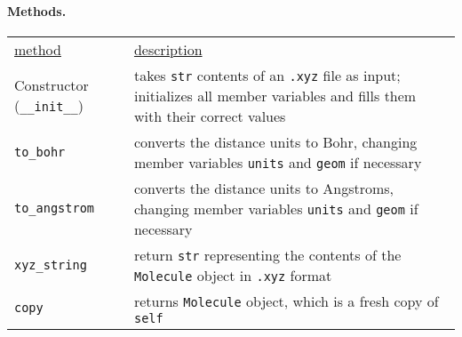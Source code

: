 \documentclass[fleqn]{article}
\newcommand{\linl}[1]{\lstinline{#1}{}}
\newcommand{\ul}[1]{\underline{#1}}
\begin{document}
\paragraph{Methods.}
\begin{center}
\begin{tabular}{p{}@{}p{}}
  \ul{method} & \ul{description}\\
  Constructor (\linl{__init__})
  & takes \linl{str} contents of an \linl{.xyz} file as input; initializes all member variables and fills them with their correct values\\
  \linl{to_bohr}
  & converts the distance units to Bohr, changing member variables \linl{units} and \linl{geom} if necessary \\
  \linl{to_angstrom}
  & converts the distance units to Angstroms, changing member variables \linl{units} and \linl{geom} if necessary \\
  \linl{xyz_string}
  & return \linl{str} representing the contents of the \linl{Molecule} object in \linl{.xyz} format\\
  \linl{copy}
  & returns \linl{Molecule} object, which is a fresh copy of \linl{self}
\end{tabular}
\end{center}
\end{document}
